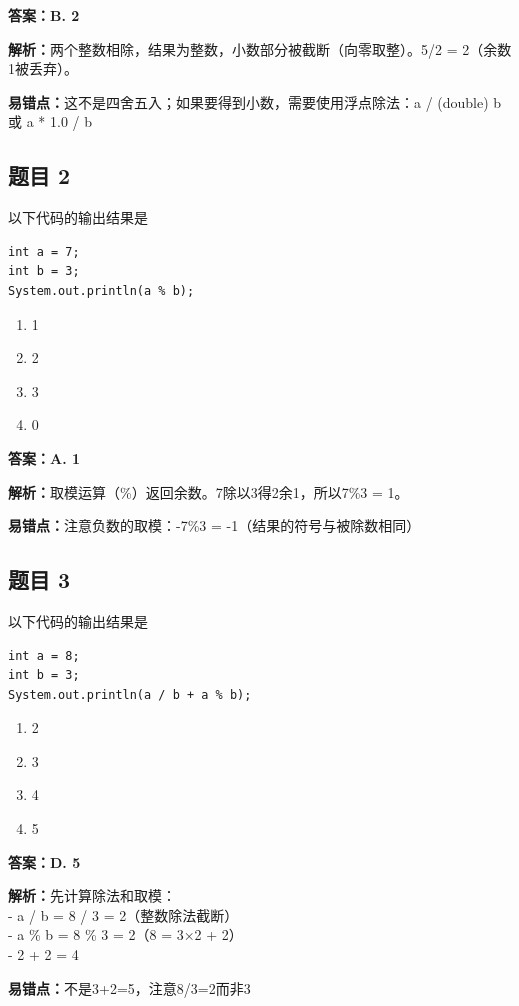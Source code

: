 \documentclass[12pt,a4paper]{ctexart}
\begin{document}
\begin{answerbox}
	\textbf{答案：B. 2}

	\textbf{解析：}两个整数相除，结果为整数，小数部分被截断（向零取整）。5/2 = 2（余数1被丢弃）。

	\textbf{易错点：}这不是四舍五入；如果要得到小数，需要使用浮点除法：a / (double) b 或 a * 1.0 / b
\end{answerbox}

\subsection*{题目 2}
以下代码的输出结果是
\begin{lstlisting}
int a = 7;
int b = 3;
System.out.println(a % b);
\end{lstlisting}

\begin{enumerate}[label=\Alph*.]
	\item 1
	\item 2
	\item 3
	\item 0
\end{enumerate}

\begin{answerbox}
	\textbf{答案：A. 1}

	\textbf{解析：}取模运算（\%）返回余数。7除以3得2余1，所以7\%3 = 1。

	\textbf{易错点：}注意负数的取模：-7\%3 = -1（结果的符号与被除数相同）
\end{answerbox}

\subsection*{题目 3}
以下代码的输出结果是
\begin{lstlisting}
int a = 8;
int b = 3;
System.out.println(a / b + a % b);
\end{lstlisting}

\begin{enumerate}[label=\Alph*.]
	\item 2
	\item 3
	\item 4
	\item 5
\end{enumerate}

\begin{answerbox}
	\textbf{答案：D. 5}

	\textbf{解析：}先计算除法和取模：\\
	- a / b = 8 / 3 = 2（整数除法截断）\\
	- a \% b = 8 \% 3 = 2（8 = 3×2 + 2）\\
	- 2 + 2 = 4

	\textbf{易错点：}不是3+2=5，注意8/3=2而非3
\end{answerbox}
\end{document}

